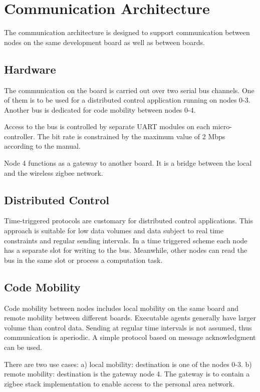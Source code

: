 \documentclass{scrreprt}
\begin{document}
\section{Communication Architecture}
The communication architecture is designed to support communication 
between nodes on the same development board as well as between boards.


\subsection{Hardware}

The communication on the board is carried out
over two serial bus channels. One of them is to be used for a distributed control
application running on nodes 0-3. Another bus is dedicated for code mobility between nodes 0-4.

Access to the bus is controlled by separate UART modules on each
micro-controller. The bit rate is constrained by the maximum value of 2 Mbps according to the manual.  

Node 4 functions as a gateway to another board. It is a bridge between the local
and the wireless zigbee network.

\subsection{Distributed Control} 
Time-triggered protocols are customary for distributed control applications.
This approach is suitable for low data volumes and data subject to real time
constraints and regular sending intervals. 
In a time triggered scheme each node has a separate slot for writing to the bus.
Meanwhile, other nodes can read the bus in the same slot or process a computation task.


\subsection{Code Mobility}
Code mobility between nodes includes local mobility on the same board and
remote mobility between different boards. Executable agents generally have
larger volume than control data. Sending at regular time intervals is not assumed,
thus communication is aperiodic.
A simple protocol based on message acknowledgment can be used. 

There are two use cases: a) local mobility: destination is one of the nodes 0-3.
b) remote mobility: destination is the gateway node 4. 
The gateway is to contain a zigbee stack implementation to enable 
access to the personal area network.
\end{document}
